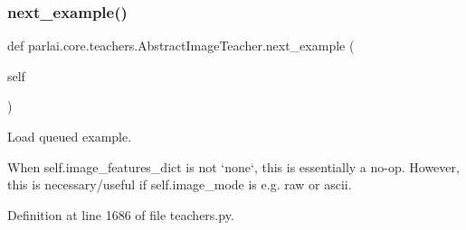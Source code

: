 \subsubsection{\texorpdfstring{next\+\_\+example()}{next\_example()}}
{\footnotesize\ttfamily def parlai.\+core.\+teachers.\+Abstract\+Image\+Teacher.\+next\+\_\+example (\begin{DoxyParamCaption}\item[{}]{self }\end{DoxyParamCaption})}

\begin{DoxyVerb}Load queued example.

When self.image_features_dict is not `none`, this is essentially a no-op.
However, this is necessary/useful if self.image_mode is e.g. raw or ascii.
\end{DoxyVerb}
 

Definition at line 1686 of file teachers.\+py.



